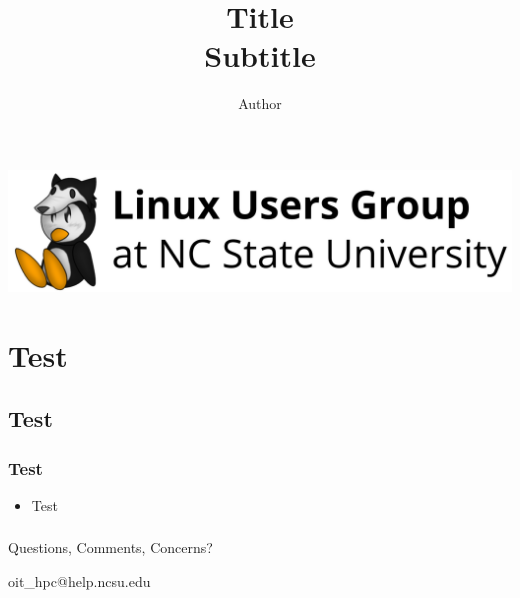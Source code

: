 \documentclass[
	hyperref={
		colorlinks,
		citecolor=DeepPink4,
		linkcolor=DarkRed,
		urlcolor=DarkRed
	},
	notes=none                   %
]{beamer}
\title[Short title]{Title \\ \small{Subtitle}}
\author{Author} %
\institute[LUG @ NC State] %
{
	LUG @ NC State\\ %
}
\begin{document}
{
	\begin{frame}[noframenumbering]
		\hfill\includegraphics[height=.2\pageheight]{lug-logo.png}\hspace*{\fill}
		\titlepage
	\end{frame}
}



\section{Test}
\subsection{Test}

\begin{frame}[fragile] %
\frametitle{Test}

\vfill

\begin{itemize}
	\item Test \cite{lug}
\end{itemize}

\vfill

\end{frame}


\begin{frame}[fragile] %
\frametitle{}

\vfill

\centering

\huge
Questions, Comments, Concerns?

\vfill

\large
oit\_hpc@help.ncsu.edu

\vfill

\end{frame}
\end{document}
